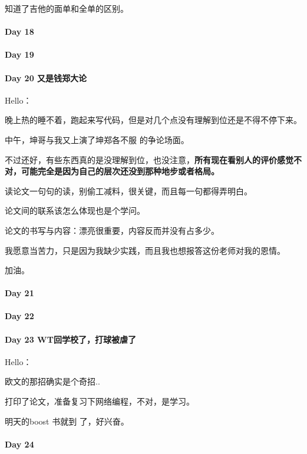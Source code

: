 \documentclass[UTF8,a4paper,8pt]{ctexbook}
\begin{document}
 	 知道了吉他的面单和全单的区别。
 	 
 	 \paragraph{Day 18      \quad     }
 	 \paragraph{Day 19      \quad     }
 	 \paragraph{Day 20   又是钱郑大论   \quad     }
	 	 Hello：
	 	 
	 	 晚上热的睡不着，跑起来写代码，但是对几个点没有理解到位还是不得不停下来。
	 	 
	 	 中午，坤哥与我又上演了坤郑各不服 的争论场面。
	 	 
	 	 不过还好，有些东西真的是没理解到位，也没注意，\textbf{所有现在看别人的评价感觉不对，可能完全是因为自己的层次还没到那种地步或者格局。}
	 	 
	 	 读论文一句句的读，别偷工减料，很关键，而且每一句都得弄明白。
	 	 
	 	 论文间的联系该怎么体现也是个学问。
	 	 
	 	 论文的书写与内容：漂亮很重要，内容反而并没有占多少。
	 	 
	 	 我愿意当苦力，只是因为我缺少实践，而且我也想报答这份老师对我的恩情。
	 	 
	 	 加油。
 	 \paragraph{Day 21      \quad     }
 	 \paragraph{Day 22      \quad     }
 	 \paragraph{Day 23   WT回学校了，打球被虐了   \quad     }Hello：
 	 
 	 欧文的那招确实是个奇招..
 	 
 	 打印了论文，准备复习下网络编程，不对，是学习。
 	 
 	 明天的boost 书就到 了，好兴奋。
 	 \paragraph{Day 24      \quad     }
\end{document}
